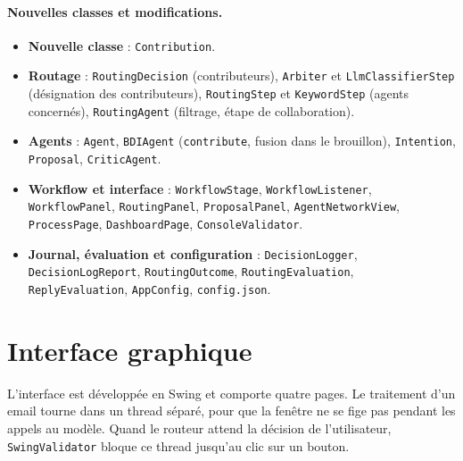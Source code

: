 \documentclass[11pt,a4paper]{article}
\newcommand{\code}[1]{\texttt{#1}}
\begin{document}
\paragraph{Nouvelles classes et modifications.}
\begingroup\raggedright
\begin{itemize}
  \item \textbf{Nouvelle classe} : \code{Contribution}.
  \item \textbf{Routage} : \code{RoutingDecision} (contributeurs), \code{Arbiter} et
        \code{LlmClassifierStep} (désignation des contributeurs), \code{RoutingStep} et
        \code{KeywordStep} (agents concernés), \code{RoutingAgent} (filtrage, étape de
        collaboration).
  \item \textbf{Agents} : \code{Agent}, \code{BDIAgent} (\code{contribute}, fusion dans le
        brouillon), \code{Intention}, \code{Proposal}, \code{CriticAgent}.
  \item \textbf{Workflow et interface} : \code{WorkflowStage}, \code{WorkflowListener},
        \code{WorkflowPanel}, \code{RoutingPanel}, \code{ProposalPanel},
        \code{AgentNetworkView}, \code{ProcessPage}, \code{DashboardPage},
        \code{ConsoleValidator}.
  \item \textbf{Journal, évaluation et configuration} : \code{DecisionLogger},
        \code{DecisionLogReport}, \code{RoutingOutcome}, \code{RoutingEvaluation},
        \code{ReplyEvaluation}, \code{AppConfig}, \code{config.json}.
\end{itemize}
\par\endgroup

\section{Interface graphique}

L'interface est développée en Swing et comporte quatre pages. Le traitement d'un email
tourne dans un thread séparé, pour que la fenêtre ne se fige pas pendant les appels au
modèle. Quand le routeur attend la décision de l'utilisateur, \code{SwingValidator}
bloque ce thread jusqu'au clic sur un bouton.
\end{document}
